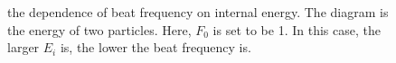\documentclass[aps,pre,twocolumn,groupedaddress]{revtex4-1}
\begin{document}
\begin{figure}
{}

\caption{the dependence of beat frequency on internal energy. The diagram is the energy of two particles. Here, $F_0$ is set to be 1. In this case, the larger $E_i$ is, the lower the beat frequency is. \label{fig:thermalization1}}%

\end{figure}
\end{document}
